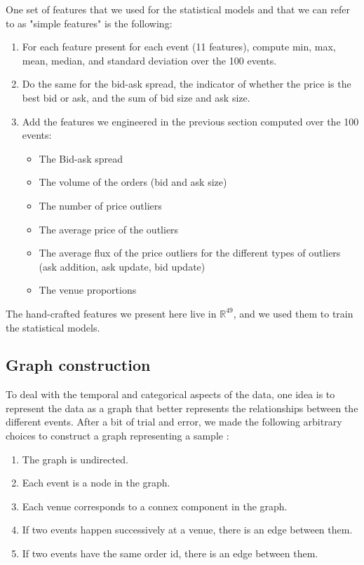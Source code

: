 \documentclass[switch, 11pt]{article}
\newcommand{\R}{\mathbb{R}}
\begin{document}
\begin{multicols}{2}
    One set of features that we used for the statistical models and that we can refer to as "simple features" is the following:
    \begin{enumerate}
        \item For each feature present for each event (11 features), compute min, max, mean, median, and standard deviation over the 100 events.
        \item Do the same for the bid-ask spread, the indicator of whether the price is the best bid or ask, and the sum of bid size and ask size.
        \item Add the features we engineered in the previous section computed over the 100 events:
              \begin{itemize}
                  \item The Bid-ask spread
                  \item The volume of the orders (bid and ask size)
                  \item The number of price outliers
                  \item The average price of the outliers
                  \item The average flux of the price outliers for the different types of outliers (ask addition, ask update, bid update)
                  \item The venue proportions
              \end{itemize}
    \end{enumerate}
    The hand-crafted features we present here live in $\R^{49}$, and we used them to train the statistical models.

    \subsection{Graph construction}

    To deal with the temporal and categorical aspects of the data, one idea is to represent the data as a graph that better represents the relationships between the different events. After a bit of trial and error, we made the following arbitrary choices to construct a graph representing a sample :
    \begin{enumerate}
        \item The graph is undirected.
        \item Each event is a node in the graph.
        \item Each venue corresponds to a connex component in the graph.
        \item If two events happen successively at a venue, there is an edge between them.
        \item If two events have the same order id, there is an edge between them.
    \end{enumerate}


\end{multicols}
\end{document}
